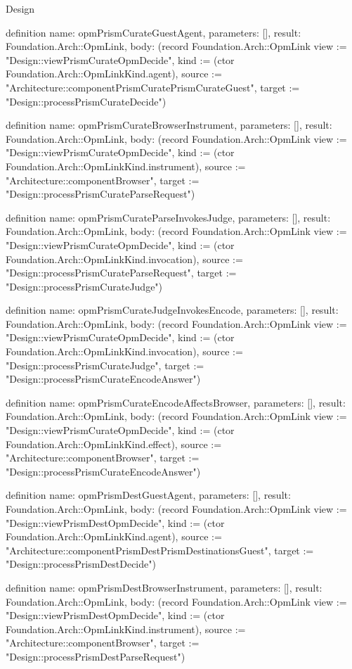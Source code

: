 \begin{lexlean}{Design}
\begin{semanticmodule}
definition{
  name: opmPrismCurateGuestAgent,
  parameters: [],
  result: Foundation.Arch::OpmLink,
  body: (record Foundation.Arch::OpmLink {view := "Design::viewPrismCurateOpmDecide", kind := (ctor Foundation.Arch::OpmLinkKind.agent), source := "Architecture::componentPrismCuratePrismCurateGuest", target := "Design::processPrismCurateDecide"})
}

definition{
  name: opmPrismCurateBrowserInstrument,
  parameters: [],
  result: Foundation.Arch::OpmLink,
  body: (record Foundation.Arch::OpmLink {view := "Design::viewPrismCurateOpmDecide", kind := (ctor Foundation.Arch::OpmLinkKind.instrument), source := "Architecture::componentBrowser", target := "Design::processPrismCurateParseRequest"})
}

definition{
  name: opmPrismCurateParseInvokesJudge,
  parameters: [],
  result: Foundation.Arch::OpmLink,
  body: (record Foundation.Arch::OpmLink {view := "Design::viewPrismCurateOpmDecide", kind := (ctor Foundation.Arch::OpmLinkKind.invocation), source := "Design::processPrismCurateParseRequest", target := "Design::processPrismCurateJudge"})
}

definition{
  name: opmPrismCurateJudgeInvokesEncode,
  parameters: [],
  result: Foundation.Arch::OpmLink,
  body: (record Foundation.Arch::OpmLink {view := "Design::viewPrismCurateOpmDecide", kind := (ctor Foundation.Arch::OpmLinkKind.invocation), source := "Design::processPrismCurateJudge", target := "Design::processPrismCurateEncodeAnswer"})
}

definition{
  name: opmPrismCurateEncodeAffectsBrowser,
  parameters: [],
  result: Foundation.Arch::OpmLink,
  body: (record Foundation.Arch::OpmLink {view := "Design::viewPrismCurateOpmDecide", kind := (ctor Foundation.Arch::OpmLinkKind.effect), source := "Architecture::componentBrowser", target := "Design::processPrismCurateEncodeAnswer"})
}

definition{
  name: opmPrismDestGuestAgent,
  parameters: [],
  result: Foundation.Arch::OpmLink,
  body: (record Foundation.Arch::OpmLink {view := "Design::viewPrismDestOpmDecide", kind := (ctor Foundation.Arch::OpmLinkKind.agent), source := "Architecture::componentPrismDestPrismDestinationsGuest", target := "Design::processPrismDestDecide"})
}

definition{
  name: opmPrismDestBrowserInstrument,
  parameters: [],
  result: Foundation.Arch::OpmLink,
  body: (record Foundation.Arch::OpmLink {view := "Design::viewPrismDestOpmDecide", kind := (ctor Foundation.Arch::OpmLinkKind.instrument), source := "Architecture::componentBrowser", target := "Design::processPrismDestParseRequest"})
}


\end{semanticmodule}
\end{lexlean}
